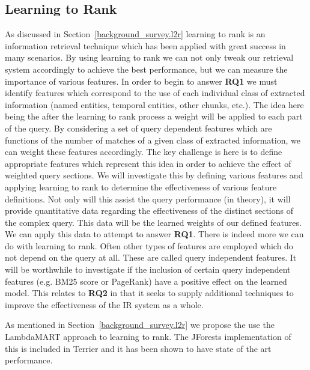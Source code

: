 \documentclass{mprop}
\begin{document}
\subsection{Learning to Rank} \label{proposed_approach.l2r}
As discussed in Section~\ref{background_survey.l2r} learning to rank is an information retrieval technique which has been applied with great success in many scenarios.
By using learning to rank we can not only tweak our retrieval system accordingly to achieve the best performance, but we can measure the importance of various features.
In order to begin to answer \textbf{RQ1} we must identify features which correspond to the use of each individual class of extracted information (named entities, temporal entities, other chunks, etc.).
The idea here being the after the learning to rank process a weight will be applied to each part of the query.
By considering a set of query dependent features which are functions of the number of matches of a given class of extracted information, we can weight these features accordingly.
The key challenge is here is to define appropriate features which represent this idea in order to achieve the effect of weighted query sections. 
We will investigate this by defining various features and applying learning to rank to determine the effectiveness of various feature definitions. 
Not only will this assist the query performance (in theory), it will provide quantitative data regarding the effectiveness of the distinct sections of the complex query. This data will be the learned weights of our defined features. 
We can apply this data to attempt to answer \textbf{RQ1}.
There is indeed more we can do with learning to rank.
Often other types of features are employed which do not depend on the query at all. 
These are called query independent features.
It will be worthwhile to investigate if the inclusion of certain query independent features (e.g. BM25 score or PageRank) have a positive effect on the learned model.
This relates to \textbf{RQ2} in that it seeks to supply additional techniques to improve the effectiveness of the IR system as a whole.

As mentioned in Section~\ref{background_survey.l2r} we propose the use the LambdaMART approach to learning to rank. The JForests implementation of this is included in Terrier and it has been shown to have state of the art performance.
\end{document}
